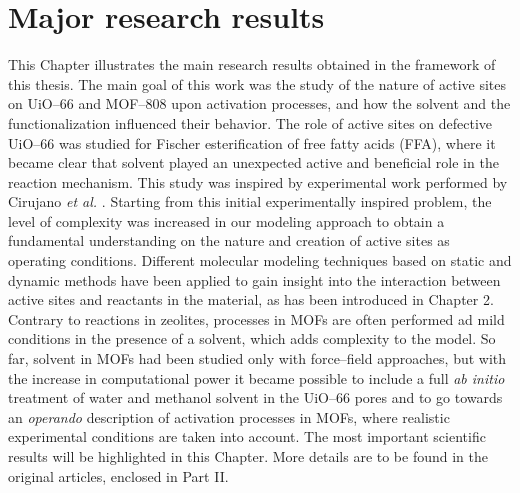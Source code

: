 \graphicspath{{figures/chapter3/}}
\renewcommand\evenpagerightmark{{\scshape\small Major research results}}
\renewcommand\oddpageleftmark{{\scshape\small Chapter 3}}

\hyphenation{}
\chapter[Major research results]%
{Major research results}
\label{ch3}
This Chapter illustrates the main research results obtained in the framework of this thesis. The main goal of this work was the study of the nature of active sites on UiO--66 and MOF--808 upon activation processes, and how the solvent and the functionalization influenced their behavior. The role of active sites on defective UiO--66 was studied for Fischer esterification of free fatty acids (FFA), where it became clear that solvent played an unexpected active and beneficial role in the reaction mechanism. This study was inspired by experimental work performed by Cirujano \textit{et al.} \cite{cirujano2015conversion, cirujano2015zirconium}. Starting from this initial experimentally inspired problem, the level of complexity was increased in our modeling approach to obtain a fundamental understanding on the nature and creation of active sites as operating conditions. Different molecular modeling techniques based on static and dynamic methods have been applied to gain insight into the interaction between active sites and reactants in the material, as has been introduced in Chapter 2. Contrary to reactions in zeolites, processes in MOFs are often performed ad mild conditions in the presence of a solvent, which adds complexity to the model. So far, solvent in MOFs had been studied only with force--field approaches, but with the increase in computational power it became possible to include a full \textit{ab initio} treatment of water and methanol solvent in the UiO--66 pores and to go towards an \textit{operando} description of activation processes in MOFs, where realistic experimental conditions are taken into account. The most important scientific results will be highlighted in this Chapter. More details are to be found in the original articles, enclosed in Part II.


